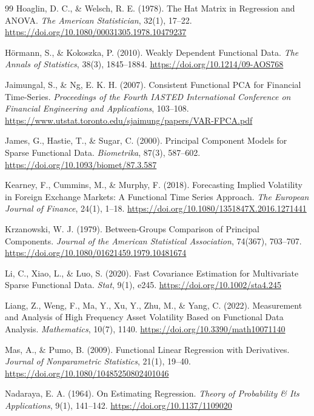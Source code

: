 \documentclass[a4paper,11pt]{article}
\begin{document}
\begin{thebibliography}{99}
Hoaglin, D. C., \& Welsch, R. E. (1978). The Hat Matrix in Regression and ANOVA. \emph{The American Statistician}, 32(1), 17--22. \url{https://doi.org/10.1080/00031305.1978.10479237}

Hörmann, S., \& Kokoszka, P. (2010). Weakly Dependent Functional Data. \emph{The Annals of Statistics}, 38(3), 1845--1884. \url{https://doi.org/10.1214/09-AOS768}

Jaimungal, S., \& Ng, E. K. H. (2007). Consistent Functional PCA for Financial Time-Series. \emph{Proceedings of the Fourth IASTED International Conference on Financial Engineering and Applications}, 103--108. \url{https://www.utstat.toronto.edu/sjaimung/papers/VAR-FPCA.pdf}

James, G., Hastie, T., \& Sugar, C. (2000). Principal Component Models for Sparse Functional Data. \emph{Biometrika}, 87(3), 587--602. \url{https://doi.org/10.1093/biomet/87.3.587}

Kearney, F., Cummins, M., \& Murphy, F. (2018). Forecasting Implied Volatility in Foreign Exchange Markets: A Functional Time Series Approach. \emph{The European Journal of Finance}, 24(1), 1--18. \url{https://doi.org/10.1080/1351847X.2016.1271441}

Krzanowski, W. J. (1979). Between-Groups Comparison of Principal Components. \emph{Journal of the American Statistical Association}, 74(367), 703--707. \url{https://doi.org/10.1080/01621459.1979.10481674}

Li, C., Xiao, L., \& Luo, S. (2020). Fast Covariance Estimation for Multivariate Sparse Functional Data. \emph{Stat}, 9(1), e245. \url{https://doi.org/10.1002/sta4.245}

Liang, Z., Weng, F., Ma, Y., Xu, Y., Zhu, M., \& Yang, C. (2022). Measurement and Analysis of High Frequency Asset Volatility Based on Functional Data Analysis. \emph{Mathematics}, 10(7), 1140. \url{https://doi.org/10.3390/math10071140}

Mas, A., \& Pumo, B. (2009). Functional Linear Regression with Derivatives. \emph{Journal of Nonparametric Statistics}, 21(1), 19--40. \url{https://doi.org/10.1080/10485250802401046}

Nadaraya, E. A. (1964). On Estimating Regression. \emph{Theory of Probability \& Its Applications}, 9(1), 141--142. \url{https://doi.org/10.1137/1109020}


\end{thebibliography}
\end{document}
